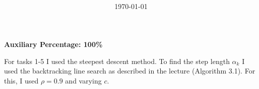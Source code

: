 \documentclass[12pt, a4paper, parskip=half]{scrartcl}
\title{
	\vspace{2in}
	\textmd{\textbf{\hmwkClass}\\ \hmwSubTitle}\\
	\vspace{3in}
}
\author{\hmwkAuthorName}
\date{\today}
\begin{document}
    \maketitle

    \newpage

    \Large\textbf{Auxiliary Percentage: 100\%}\normalsize

    For tasks 1-5 I used the steepest descent method. To find the step length $\alpha_k$ I used the backtracking line search as described in the lecture (Algorithm 3.1). For this, I used $\rho = 0.9$ and varying $c$.


    \begin{enumerate}[leftmargin=0.5cm, label=(\roman*)]


\end{enumerate}
\end{document}

